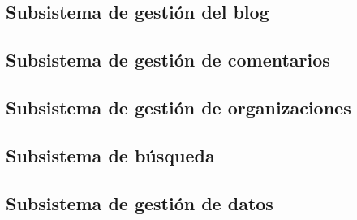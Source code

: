 \subsection{Subsistema de gestión del blog}
\label{casos_uso_subsistema_blog}


\subsection{Subsistema de gestión de comentarios}
\label{casos_uso_subsistema_comentarios}


\subsection{Subsistema de gestión de organizaciones}
\label{casos_uso_subsistema_organizaciones}


\subsection{Subsistema de búsqueda}
\label{casos_uso_subsistema_busqueda}


\subsection{Subsistema de gestión de datos}
\label{casos_uso_subsistema_datos}
